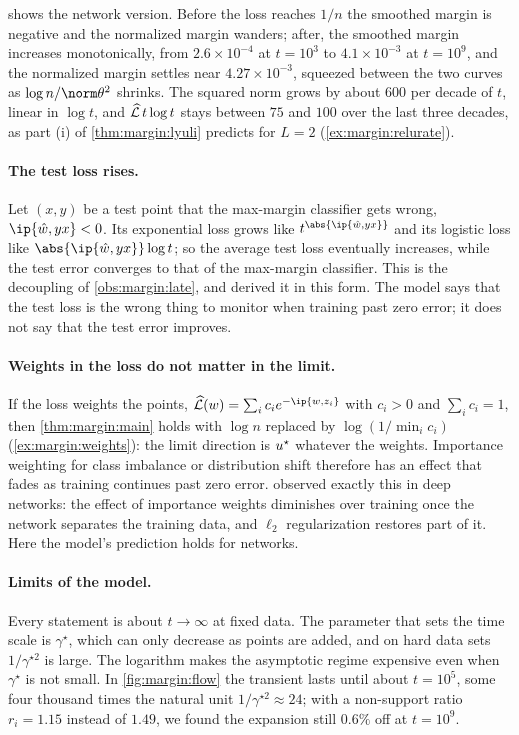 \begin{refsection}
 shows the network version. Before the loss reaches $1/n$ the smoothed margin is negative and the normalized margin wanders; after, the smoothed margin increases monotonically, from $2.6\times10^{-4}$ at $t=10^3$ to $4.1\times10^{-3}$ at $t=10^9$, and the normalized margin settles near $4.27\times10^{-3}$, squeezed between the two curves as $\log n/\norm\theta^2$ shrinks. The squared norm grows by about $600$ per decade of $t$, linear in $\log t$, and $\widehat{\mathcal{L}}\,t\log t$ stays between $75$ and $100$ over the last three decades, as part (i) of \cref{thm:margin:lyuli} predicts for $L=2$ (\cref{ex:margin:relurate}).

\paragraph{The test loss rises.} Let $(x,y)$ be a test point that the max-margin classifier gets wrong, $\ip{\marginwhat,yx}<0$. Its exponential loss grows like $t^{\abs{\ip{\marginwhat,yx}}}$ and its logistic loss like $\abs{\ip{\marginwhat,yx}}\log t$; so the average test loss eventually increases, while the test error converges to that of the max-margin classifier. This is the decoupling of \cref{obs:margin:late}, and \textcite{SoudryEtAl2018} derived it in this form. The model says that the test loss is the wrong thing to monitor when training past zero error; it does not say that the test error improves.

\paragraph{Weights in the loss do not matter in the limit.} If the loss weights the points, $\Lhat(w)=\sum_ic_ie^{-\ip{w,z_i}}$ with $c_i>0$ and $\sum_ic_i=1$, then \cref{thm:margin:main} holds with $\log n$ replaced by $\log(1/\min_ic_i)$ (\cref{ex:margin:weights}): the limit direction is $u^\star$ whatever the weights. Importance weighting for class imbalance or distribution shift therefore has an effect that fades as training continues past zero error. \Textcite{ByrdLipton2019} observed exactly this in deep networks: the effect of importance weights diminishes over training once the network separates the training data, and $\ell_2$ regularization restores part of it. Here the model's prediction holds for networks.

\paragraph{Limits of the model.} Every statement is about $t\to\infty$ at fixed data. The parameter that sets the time scale is $\gamma^\star$, which can only decrease as points are added, and on hard data sets $1/\gamma^{\star2}$ is large. The logarithm makes the asymptotic regime expensive even when $\gamma^\star$ is not small. In \cref{fig:margin:flow} the transient lasts until about $t=10^5$, some four thousand times the natural unit $1/\gamma^{\star2}\approx24$; with a non-support ratio $r_i=1.15$ instead of $1.49$, we found the expansion still $0.6\%$ off at $t=10^9$.


\end{refsection}
